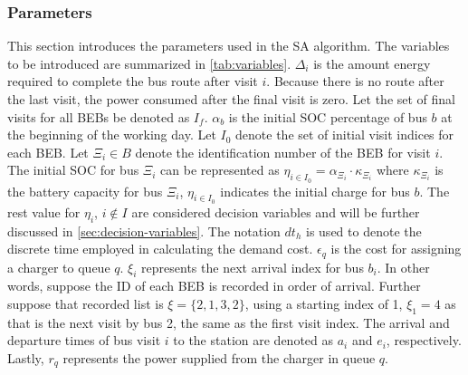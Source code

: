 \documentclass[11pt,a4paper,final]{article}
\newcommand{\Isetinit}{I_0}                 %
\newcommand{\Isetfinal}{I_f}                %
\begin{document}
\subsubsection{Parameters}
\label{sec:input-variables}
This section introduces the parameters used in the SA algorithm. The variables to be introduced are summarized in
\ref{tab:variables}. \(\Delta_i\) is the amount energy required to complete the bus route after visit \(i\). Because there is no route
after the last visit, the power consumed after the final visit is zero. Let the set of final visits for all BEBs be
denoted as \(\Isetfinal\). \(\alpha_b\) is the initial SOC percentage of bus \(b\) at the beginning of the working day. Let
\(\Isetinit\) denote the set of initial visit indices for each BEB. Let \(\Xi_i \in B\) denote the identification number of the
BEB for visit \(i\). The initial SOC for bus \(\Xi_i\) can be represented as \(\eta_{i \in \Isetinit} = \alpha_{\Xi_i} \cdot \kappa_{\Xi_i}\) where
\(\kappa_{\Xi_i}\) is the battery capacity for bus \(\Xi_i\), \(\eta_{i \in \Isetinit}\) indicates the initial charge for bus \(b\). The rest
value for \(\eta_i\), \(i \not\in I\) are considered decision variables and will be further discussed in \ref{sec:decision-variables}.
The notation \(dt_h\) is used to denote the discrete time employed in calculating the demand cost. \(\epsilon_q\) is the cost for
assigning a charger to queue \(q\). \(\xi_i\) represents the next arrival index for bus \(b_i\). In other words, suppose the ID
of each BEB is recorded in order of arrival. Further suppose that recorded list is \(\xi = \{ 2,1,3,2 \}\), using a starting
index of 1, \(\xi_1 = 4\) as that is the next visit by bus 2, the same as the first visit index. The arrival and departure
times of bus visit \(i\) to the station are denoted as \(a_i\) and \(e_i\), respectively. Lastly, \(r_q\) represents the power
supplied from the charger in queue \(q\).
\end{document}
